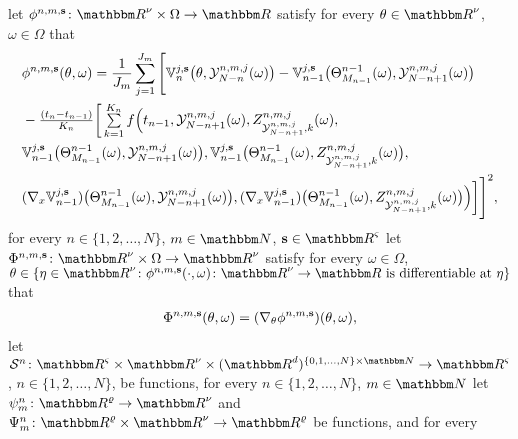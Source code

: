 \begin{algo}
	let
	$\phi^{n,m,{\textbf s}}\colon\R^{\nu}\times\Omega\to\R$
	satisfy for every
	$\theta\in\R^{\nu}$,
	$\omega\in\Omega$ that
	\begin{equation}
	\begin{split}
	& \phi^{n,m,{\textbf s}}(\theta,\omega)
	=
	\frac{1}{J_m}\sum_{j=1}^{J_m}
	\Bigg[
	{\mathbb{V}}^{j,{\textbf s}}_n\big(\theta,{\mathcal{Y}}^{n,m,j}_{N-n}(\omega)\big)
	-
	{\mathbb{V}}^{j,{\textbf s}}_{n-1}\big(\Theta^{n-1}_{M_{n-1}}(\omega),{\mathcal{Y}}^{n,m,j}_{N-n+1}(\omega)\bigr)\\
	& - \tfrac{(t_n-t_{n-1})}{K_n} \bigg[ \textstyle \sum \limits_{k=1}^{K_n}  f\Big(t_{n-1},
	{\mathcal{Y}}^{n,m,j}_{N-n+1}(\omega),
	Z_{ \mathcal{Y}^{n,m,j}_{ N - n + 1 }, k }^{ n, m,j }(\omega),\\
	& {\mathbb{V}}^{j,{\textbf s}}_{n-1}\big(\Theta^{n-1}_{M_{n-1}}(\omega),{\mathcal{Y}}^{n,m,j}_{N-n+1}(\omega)\bigr),
	{\mathbb{V}}^{j,{\textbf s}}_{n-1}\big(\Theta^{n-1}_{M_{n-1}}(\omega),	Z_{ \mathcal{Y}^{n,m,j}_{ N - n + 1 }, k }^{ n, m,j }(\omega)\bigr),\\
	& (\nabla_x {\mathbb{V}}^{j,{\textbf s}}_{n-1})\big(\Theta^{n-1}_{M_{n-1}}(\omega),{\mathcal{Y}}^{n,m,j}_{N-n+1}(\omega)\big),
	(\nabla_x {\mathbb{V}}^{j,{\textbf s}}_{n-1})\big(\Theta^{n-1}_{M_{n-1}}(\omega),Z_{ \mathcal{Y}^{n,m,j}_{ N - n + 1 }, k }^{ n, m,j }(\omega)\big)
	\Big)\bigg]
	\Bigg]^2,
	\end{split}
	\end{equation}
	for every
	$n\in\{1,2,\ldots,N\}$,
	$m\in\N$,
	${\textbf s}\in\R^{\varsigma}$
	let
	$\Phi^{n,m,{\textbf s}}\colon\R^{\nu}\times\Omega\to\R^{\nu}$ 
	satisfy for every
	$\omega\in\Omega$,
	$\theta\in\{\eta\in\R^{\nu}\colon \phi^{n,m,{\textbf s}}(\cdot,\omega)\colon\R^{\nu}\to\R~\text{is differentiable at}~\eta\}$
	that
	\begin{align}
	\Phi^{n,m,{\textbf s}}(\theta,\omega) = (\nabla_{\theta}\phi^{n,m,{\textbf s}})(\theta,\omega),
	\end{align}
	let $\S^n\colon\R^{\varsigma}\times\R^{\nu}\times(\R^d)^{\{0,1,\ldots,N\}\times\N}\to\R^{\varsigma}$, $n\in\{1,2,\ldots,N\}$,
	be functions,
	for every
	$n\in\{1,2,\ldots,N\}$,
	$m\in\N$
	let $\psi^n_m\colon\R^{\varrho}\to\R^{\nu}$
	and $\Psi^n_m\colon\R^{\varrho}\times\R^{\nu}\to\R^{\varrho}$
	be functions,
	and for every

\end{algo}
